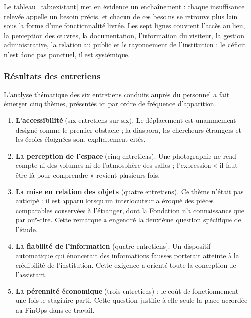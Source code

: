 Le tableau~\ref{tab:existant} met en évidence un enchaînement : chaque
insuffisance relevée appelle un besoin précis, et chacun de ces besoins se
retrouve plus loin sous la forme d'une fonctionnalité livrée. Les sept lignes
couvrent l'accès au lieu, la perception des œuvres, la documentation,
l'information du visiteur, la gestion administrative, la relation au public et
le rayonnement de l'institution : le déficit n'est donc pas ponctuel, il est
systémique.

\subsubsection{Résultats des entretiens}

L'analyse thématique des six entretiens conduits auprès du personnel a fait
émerger cinq thèmes, présentés ici par ordre de fréquence d'apparition.

\begin{enumerate}
  \item \textbf{L'accessibilité} (six entretiens sur six). Le déplacement est
        unanimement désigné comme le premier obstacle ; la diaspora, les
        chercheurs étrangers et les écoles éloignées sont explicitement cités.

  \item \textbf{La perception de l'espace} (cinq entretiens). Une photographie
        ne rend compte ni des volumes ni de l'atmosphère des salles ;
        l'expression « il faut être là pour comprendre » revient plusieurs fois.

  \item \textbf{La mise en relation des objets} (quatre entretiens). Ce thème
        n'était pas anticipé : il est apparu lorsqu'un interlocuteur a évoqué
        des pièces comparables conservées à l'étranger, dont la Fondation n'a
        connaissance que par ouï-dire. Cette remarque a engendré la deuxième
        question spécifique de l'étude.

  \item \textbf{La fiabilité de l'information} (quatre entretiens). Un
        dispositif automatique qui énoncerait des informations fausses
        porterait atteinte à la crédibilité de l'institution. Cette exigence a
        orienté toute la conception de l'assistant.

  \item \textbf{La pérennité économique} (trois entretiens) : le coût de
        fonctionnement une fois le stagiaire parti. Cette question justifie à
        elle seule la place accordée au FinOps dans ce travail.
\end{enumerate}


